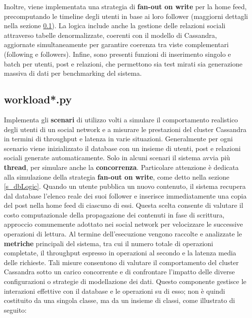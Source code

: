 \documentclass[12pt]{article}
\begin{document}
\noindent
Inoltre, viene implementata una strategia di \textbf{fan-out on write} per la home feed, precomputando le timeline degli utenti in base ai loro follower (maggiorni dettagli nella sezione \ref{s_workload}).\newline\newline
\noindent
La logica include anche la gestione delle relazioni sociali attraverso tabelle denormalizzate, coerenti con il modello di Cassandra, aggiornate simultaneamente per garantire coerenza tra viste complementari (following e followers).\newline\newline
\noindent
Infine, sono presenti funzioni di inserimento singolo e batch per utenti, post e relazioni, che permettono sia test mirati sia generazione massiva di dati per benchmarking del sistema.

\subsection{workload*.py} \label{s_workload}
Implementa gli \textbf{scenari} di utilizzo volti a simulare il comportamento realistico degli utenti di un social network e a misurare le prestazioni del cluster Cassandra in termini di throughput e latenza in varie situazioni.\newline
Generalmente per ogni scenario viene inizializzato il database con un insieme di utenti, post e relazioni sociali generate automaticamente. Solo in alcuni scenari il sistema avvia più \textbf{thread}, per simulare anche la \textbf{concorrenza}.\newline\newline
\noindent
Particolare attenzione è dedicata alla simulazione della strategia \textbf{fan-out on write}, come detto nella sezione \ref{s_dbLogic}. Quando un utente pubblica un nuovo contenuto, il sistema recupera dal database l'elenco reale dei suoi follower e inserisce immediatamente una copia del post nella home feed di ciascuno di essi. Questa scelta consente di valutare il costo computazionale della propagazione dei contenuti in fase di scrittura, approccio comunemente adottato nei social network per velocizzare le successive operazioni di lettura.\newline\newline
\noindent
Al termine dell'esecuzione vengono raccolte e analizzate le \textbf{metriche} principali del sistema, tra cui il numero totale di operazioni completate, il throughput espresso in operazioni al secondo e la latenza media delle richieste. Tali misure consentono di valutare il comportamento del cluster Cassandra sotto un carico concorrente e di confrontare l'impatto delle diverse configurazioni o strategie di modellazione dei dati.\newline\newline
\noindent
Questo componente gestisce le interazioni effettive con il database e le operazioni su di esso; non è quindi costituito da una singola classe, ma da un insieme di classi, come illustrato di seguito:
\end{document}
